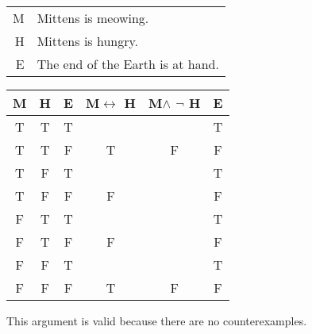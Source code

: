 \begin{tabular}{r l}
    M & Mittens is meowing. \\
    H & Mittens is hungry. \\
    E & The end of the Earth is at hand.
\end{tabular}

\begin{tabular}{c|c|c||c|c||c}
    M & H & E & M$\leftrightarrow$ H & M$\land$ $\lnot$ H & E \\
    \hline
    T & T & T &   &   & T \\
    T & T & F & T & F & F \\
    T & F & T &   &   & T \\
    T & F & F & F &   & F \\
    F & T & T &   &   & T \\
    F & T & F & F &   & F \\
    F & F & T &   &   & T \\
    F & F & F & T & F & F
\end{tabular}

\noindent This argument is valid because there are no counterexamples.